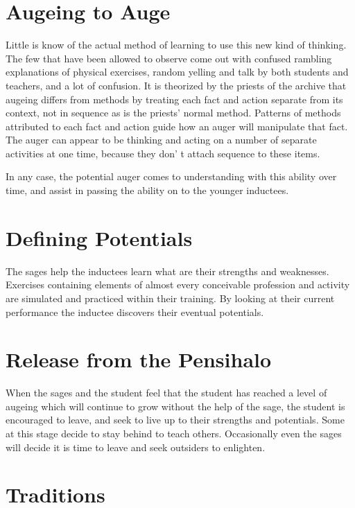 \section{Augeing to Auge}

Little is know of the actual method of learning to use this new kind of thinking. The few that have been allowed to observe come out with confused rambling explanations of physical exercises, random yelling and talk by both students and teachers, and a lot of confusion. It is theorized by the
priests of the archive that augeing differs from methods by treating each fact and action separate from its context, not in sequence as is the priests'  normal method. Patterns of methods attributed to each fact and action guide how an auger will manipulate that fact. The auger can appear to be thinking and acting on a number of separate activities at one time, because they don' t attach sequence to these items.

In any case, the potential auger comes to understanding with this ability over time, and assist in passing the ability on to the younger inductees.

\section{Defining Potentials}

The sages help the inductees learn what are their strengths and weaknesses. Exercises containing elements of almost every conceivable profession and activity are simulated and practiced within their training. By looking at their current performance the inductee discovers their eventual potentials.

\section{Release from the Pensihalo}

When the sages and the student feel that the student has reached a level of augeing which will continue to grow without the help of the sage, the student is encouraged to leave, and seek to live up to their strengths and potentials. Some at this stage decide to stay behind to teach others. Occasionally even the sages will decide it is time to leave and seek outsiders to enlighten.

\section{Traditions}

